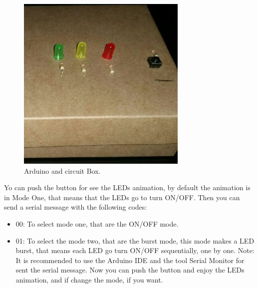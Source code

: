 \documentclass[12pt]{article}
\begin{document}
\begin{figure}[h!]
 	\centering
  	\includegraphics[scale=0.5]
  	{Fig/Box.jpg}    
  	\caption{Arduino and circuit Box.}
    \label{Box}
\end{figure}
Yo can push the button for see the LEDs animation, by default the animation is in Mode One, that means that the LEDs go to turn ON/OFF.
Then you can send a serial message with the following codes:
\begin{itemize}
\item 00: To select mode one, that are the ON/OFF mode.
\item 01: To select the mode two, that are the burst mode, this mode makes a LED burst, that means each LED go turn ON/OFF sequentially, one by one. 
\newline\newline Note: It is recommended to use the Arduino IDE and the tool Serial Monitor for sent the serial message.
\newline\newline Now you can push the button and enjoy the LEDs animation, and if change the mode, if you want.
\end{itemize}
\end{document}
